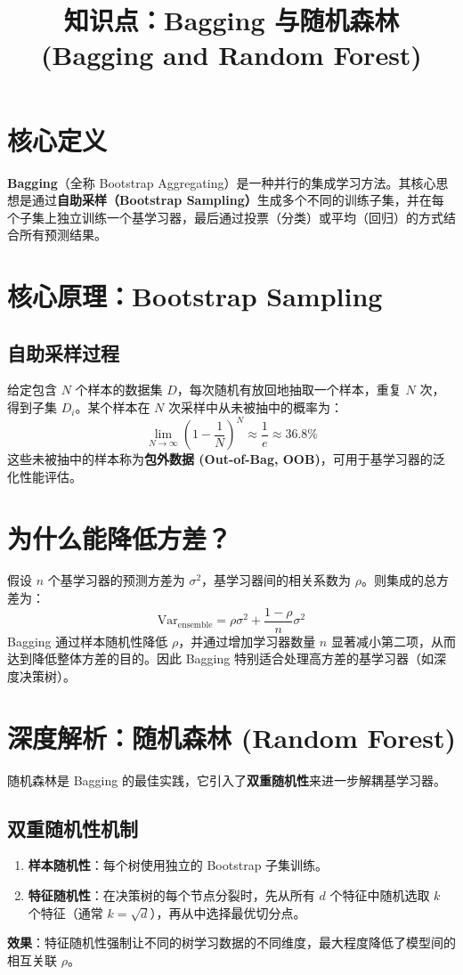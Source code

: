 \documentclass[12pt, a4paper]{article}
\title{知识点：Bagging 与随机森林 (Bagging and Random Forest)}
\author{}
\date{}
\begin{document}
\maketitle

\section{核心定义}
\textbf{Bagging}（全称 Bootstrap Aggregating）是一种并行的集成学习方法。其核心思想是通过\textbf{自助采样（Bootstrap Sampling）}生成多个不同的训练子集，并在每个子集上独立训练一个基学习器，最后通过投票（分类）或平均（回归）的方式结合所有预测结果。

\section{核心原理：Bootstrap Sampling}
\subsection{自助采样过程}
给定包含 $N$ 个样本的数据集 $D$，每次随机有放回地抽取一个样本，重复 $N$ 次，得到子集 $D_i$。某个样本在 $N$ 次采样中从未被抽中的概率为：
$$ \lim_{N \to \infty} \left( 1 - \frac{1}{N} \right)^N \approx \frac{1}{e} \approx 36.8\% $$
这些未被抽中的样本称为\textbf{包外数据 (Out-of-Bag, OOB)}，可用于基学习器的泛化性能评估。

\section{为什么能降低方差？}
假设 $n$ 个基学习器的预测方差为 $\sigma^2$，基学习器间的相关系数为 $\rho$。则集成的总方差为：
$$ \text{Var}_{\text{ensemble}} = \rho \sigma^2 + \frac{1-\rho}{n} \sigma^2 $$
Bagging 通过样本随机性降低 $\rho$，并通过增加学习器数量 $n$ 显著减小第二项，从而达到降低整体方差的目的。因此 Bagging 特别适合处理高方差的基学习器（如深度决策树）。

\section{深度解析：随机森林 (Random Forest)}
随机森林是 Bagging 的最佳实践，它引入了\textbf{双重随机性}来进一步解耦基学习器。

\subsection{双重随机性机制}
\begin{enumerate}
    \item \textbf{样本随机性}：每个树使用独立的 Bootstrap 子集训练。
    \item \textbf{特征随机性}：在决策树的每个节点分裂时，先从所有 $d$ 个特征中随机选取 $k$ 个特征（通常 $k = \sqrt{d}$），再从中选择最优切分点。
\end{enumerate}
\textbf{效果}：特征随机性强制让不同的树学习数据的不同维度，最大程度降低了模型间的相互关联 $\rho$。
\end{document}
